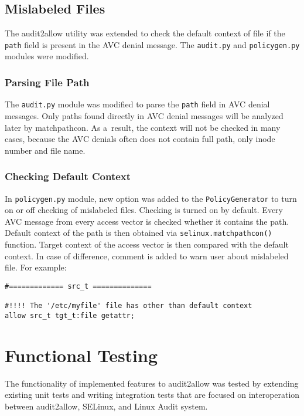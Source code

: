 \section{Mislabeled Files}
The audit2allow utility was extended to check the default context of file if the
\texttt{path} field is present in the AVC denial message. The \texttt{audit.py}
and \texttt{policygen.py} modules were modified.

\subsection{Parsing File Path}
The \texttt{audit.py} module was modified to parse the \texttt{path} field in
AVC denial messages. Only paths found directly in AVC denial messages will be
analyzed later by matchpathcon. As a~result, the context will not be checked in
many cases, because the AVC denials often does not contain full path, only inode
number and file name.

\subsection{Checking Default Context}
In \texttt{policygen.py} module, new option was added to the
\texttt{PolicyGenerator} to turn on or off checking of mislabeled files.
Checking is turned on by default. Every AVC message from every access vector is
checked whether it contains the path. Default context of the path is then
obtained via \texttt{selinux.matchpathcon()} function. Target context of the
access vector is then compared with the default context. In case of difference,
comment is added to warn user about mislabeled file. For example:
\begin{lstlisting}
#============= src_t ==============

#!!!! The '/etc/myfile' file has other than default context
allow src_t tgt_t:file getattr;
\end{lstlisting}

\chapter{Functional Testing}
The functionality of implemented features to audit2allow was tested by extending
existing unit tests and writing integration tests that are focused on
interoperation between audit2allow, SELinux, and Linux Audit system.

